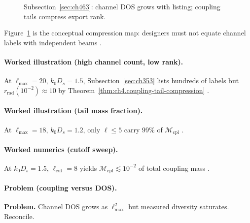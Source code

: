 \begin{figure}[t]
\centering
{}
\caption{Subsection~\ref{sec:ch463}: channel DOS grows with listing; coupling tails compress export rank.}
\label{fig:ch4.coupling-tail-compression}
\end{figure}

Figure~\ref{fig:ch4.coupling-tail-compression} is the conceptual compression map: designers must not equate channel labels with independent
beams \cite{hansen1988,harrington2001}.

\paragraph{Worked illustration (high channel count, low rank).}
At \(\ell_{\max}=20\), \(k_{0}D_{s}=1.5\), Subsection~\ref{sec:ch353} lists hundreds of labels but \(r_{\mathrm{rad}}(10^{-2})\approx10\)
by Theorem~\ref{thm:ch4.coupling-tail-compression} \cite{hansen1988,harrington2001,devaney2004}.

\paragraph{Worked illustration (tail mass fraction).}
At \(\ell_{\max}=18\), \(k_{0}D_{s}=1.2\), only \(\ell\le5\) carry \(99\%\) of \(\mathcal{M}_{\mathrm{cpl}}\) \cite{hansen1988,devaney2004}.

\paragraph{Worked numerics (cutoff sweep).}
At \(k_{0}D_{s}=1.5\), \(\ell_{\mathrm{cut}}=8\) yields \(\mathcal{M}_{\mathrm{cpl}}\lesssim10^{-2}\) of total coupling mass
\cite{hansen1988,harrington2001}.

\paragraph{Problem (coupling versus DOS).}
\textbf{Problem.} Channel DOS grows as \(\ell_{\max}^{2}\) but measured diversity saturates. Reconcile.

